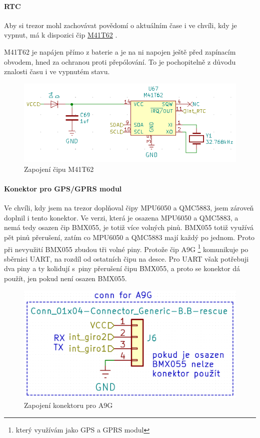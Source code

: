 \paragraph{RTC}
Aby si trezor mohl zachovávat povědomí o aktuálním čase i ve chvíli, kdy je vypnut, má k dispozici čip 
\href{https://datasheet.lcsc.com/szlcsc/STMicroelectronics-M41T62Q6F_C113207.pdf}{M41T62} \parencite{m41t62}.

M41T62 je napájen přímo z baterie a je na ni napojen ještě před zapínacím obvodem, hned za ochranou proti přepólování.
To je pochopitelně z důvodu znalosti času i ve vypnutém stavu.

\begin{figure}[htbp]
    \centering
    \includegraphics[width=\textwidth]{kapitoly/obrazky/E4/vnimani/RTC.png}
    \caption{Zapojení čipu M41T62}
    \label{fig:E4-M41T62}
\end{figure}

\newpage

\paragraph{Konektor pro GPS/GPRS modul}
Ve chvíli, kdy jsem na trezor doplňoval čipy MPU6050 a QMC5883, jsem zároveň doplnil i tento konektor. Ve verzi, která je osazena MPU6050 a QMC5883, a nemá tedy osazen čip BMX055, 
je totiž více volných pinů. BMX055 totiž využívá pět pinů přerušení, zatím co MPU6050 a QMC5883 mají každý po jednom. Proto při nevyužití BMX055 zbudou tři volné piny.
Protože čip A9G \footnote{který využívám jako GPS a GPRS modul} komunikuje po sběrnici UART, na rozdíl od ostatních čipu na desce. Pro UART však potřebuji
dva piny a ty kolidují s~piny přerušení čipu BMX055, a proto se konektor dá použít, jen pokud není osazen BMX055.

\begin{figure}[htbp]
    \centering
    \includegraphics[width=\textwidth]{kapitoly/obrazky/E4/vnimani/conn-A9G.png}
    \caption{Zapojení konektoru pro A9G}
    \label{fig:E4-A9G}
\end{figure}

\newpage